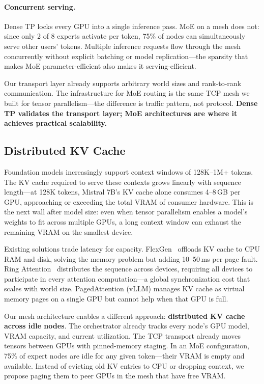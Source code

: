 \documentclass[10pt,twocolumn]{article}
\begin{document}
\paragraph{Concurrent serving.}
Dense TP locks every GPU into a single inference pass.  MoE on a mesh does
not: since only 2 of 8 experts activate per token, 75\% of nodes can
simultaneously serve other users' tokens.  Multiple inference requests flow
through the mesh concurrently without explicit batching or model
replication---the sparsity that makes MoE parameter-efficient also makes
it serving-efficient.

Our transport layer already supports arbitrary world sizes and
rank-to-rank communication.  The infrastructure for MoE routing is the
same TCP mesh we built for tensor parallelism---the difference is traffic
pattern, not protocol.  \textbf{Dense TP validates the transport layer;
MoE architectures are where it achieves practical scalability.}

\subsection{Distributed KV Cache}

Foundation models increasingly support context windows of 128K--1M+
tokens.  The KV cache required to serve these contexts grows linearly with
sequence length---at 128K tokens, Mistral 7B's KV cache alone consumes
4--8\,GB per GPU, approaching or exceeding the total VRAM of consumer
hardware.  This is the next wall after model size: even when tensor
parallelism enables a model's weights to fit across multiple GPUs, a long
context window can exhaust the remaining VRAM on the smallest device.

Existing solutions trade latency for capacity.
FlexGen~\citep{sheng2023flexgen} offloads KV cache to CPU RAM and disk,
solving the memory problem but adding 10--50\,ms per page fault.  Ring
Attention~\citep{liu2023ring} distributes the sequence across devices,
requiring all devices to participate in every attention computation---a
global synchronization cost that scales with world size.  PagedAttention
(vLLM) manages KV cache as virtual memory pages on a single GPU but cannot
help when that GPU is full.

Our mesh architecture enables a different approach: \textbf{distributed KV
cache across idle nodes}.  The orchestrator already tracks every node's GPU
model, VRAM capacity, and current utilization.  The TCP transport already
moves tensors between GPUs with pinned-memory staging.  In an MoE
configuration, 75\% of expert nodes are idle for any given token---their
VRAM is empty and available.  Instead of evicting old KV entries to CPU or
dropping context, we propose paging them to peer GPUs in the mesh that
have free VRAM\@.
\end{document}
